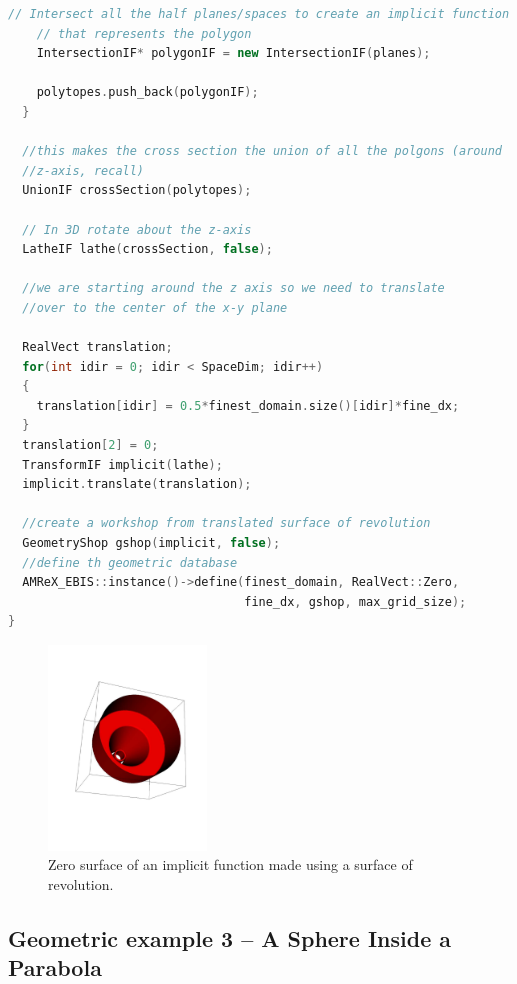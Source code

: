 \begin{lstlisting}[language=cpp]
    // Intersect all the half planes/spaces to create an implicit function
    // that represents the polygon
    IntersectionIF* polygonIF = new IntersectionIF(planes);

    polytopes.push_back(polygonIF);
  }

  //this makes the cross section the union of all the polgons (around
  //z-axis, recall)
  UnionIF crossSection(polytopes);
            
  // In 3D rotate about the z-axis 
  LatheIF lathe(crossSection, false);

  //we are starting around the z axis so we need to translate
  //over to the center of the x-y plane
            
  RealVect translation;
  for(int idir = 0; idir < SpaceDim; idir++)
  {
    translation[idir] = 0.5*finest_domain.size()[idir]*fine_dx;
  }
  translation[2] = 0;
  TransformIF implicit(lathe);
  implicit.translate(translation);

  //create a workshop from translated surface of revolution
  GeometryShop gshop(implicit, false);
  //define th geometric database
  AMReX_EBIS::instance()->define(finest_domain, RealVect::Zero,
                                 fine_dx, gshop, max_grid_size);
}

\end{lstlisting}

\begin{figure}[h]
  \centering
  \includegraphics[width=0.375\textwidth]{./EB/revolution.pdf}
  \caption{\label{fig::revolution} Zero surface of an implicit
    function made using a surface of revolution.}
\end{figure}
\subsection{Geometric example 3 -- A Sphere Inside a Parabola}

